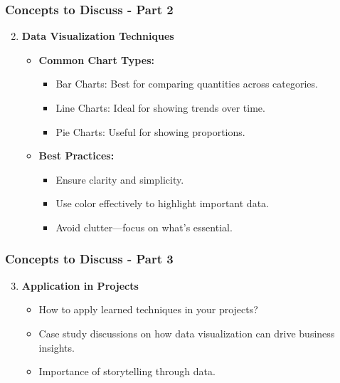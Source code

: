 \documentclass[aspectratio=169]{beamer}
\begin{document}
\begin{frame}[fragile]
    \frametitle{Concepts to Discuss - Part 2}
    \begin{enumerate}
        \setcounter{enumi}{1}
        \item \textbf{Data Visualization Techniques}
            \begin{itemize}
                \item \textbf{Common Chart Types:}
                    \begin{itemize}
                        \item Bar Charts: Best for comparing quantities across categories.
                        \item Line Charts: Ideal for showing trends over time.
                        \item Pie Charts: Useful for showing proportions.
                    \end{itemize}
                \item \textbf{Best Practices:}
                    \begin{itemize}
                        \item Ensure clarity and simplicity.
                        \item Use color effectively to highlight important data.
                        \item Avoid clutter—focus on what's essential.
                    \end{itemize}
            \end{itemize}
    \end{enumerate}
\end{frame}

\begin{frame}[fragile]
    \frametitle{Concepts to Discuss - Part 3}
    \begin{enumerate}
        \setcounter{enumi}{2}
        \item \textbf{Application in Projects}
            \begin{itemize}
                \item How to apply learned techniques in your projects?
                \item Case study discussions on how data visualization can drive business insights.
                \item Importance of storytelling through data.
            \end{itemize}
    \end{enumerate}
\end{frame}
\end{document}
